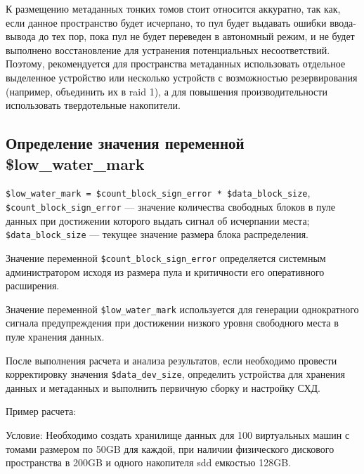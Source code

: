 \documentclass[10pt, a5paper]{article}
\begin{document}
К размещению метаданных тонких томов стоит относится аккуратно, так  как, если данное пространство будет исчерпано, то пул будет выдавать ошибки ввода-вывода до тех пор, пока пул не будет переведен в автономный режим, и не будет выполнено восстановление для устранения потенциальных несоответствий. Поэтому, рекомендуется для пространства метаданных использовать отдельное выделенное устройство или несколько устройств с возможностью резервирования (например, объединить их в raid 1), а для повышения производительности использовать твердотельные накопители.

\subsection*{Определение значения переменной \\ \$low\_water\_mark}

{\small\verb!$low_water_mark = $count_block_sign_error * $data_block_size!},
\\ \verb!$count_block_sign_error! — значение количества свободных блоков в пуле данных при достижении которого выдать сигнал об исчерпании места;
\verb!$data_block_size! — текущее значение размера блока распределения.

Значение переменной \verb!$count_block_sign_error! определяется \linebreak системным администратором исходя из размера пула и критичности его оперативного расширения. 

Значение переменной \verb!$low_water_mark! используется для генерации однократного сигнала предупреждения при достижении низкого уровня свободного места в пуле хранения данных.

После выполнения расчета и анализа результатов, если необходимо провести корректировку значения \verb!$data_dev_size!, определить устройства для хранения данных и метаданных и выполнить первичную сборку и настройку СХД.

Пример расчета:

Условие:
Необходимо создать хранилище данных для 100 виртуальных машин с томами размером по 50GB для каждой, при наличии физического дискового пространства в 200GB и одного накопителя sdd емкостью 128GB.
\end{document}
